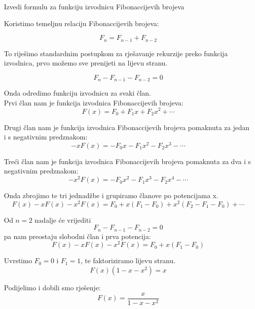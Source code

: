 \documentclass[exam.tex]{subfiles}
\begin{document}
	\begin{subtask}
		Izvedi formulu za funkciju izvodnicu Fibonaccijevih brojeva \\
	\end{subtask}
	
	Koristimo temeljnu relaciju Fibonaccijevih brojeva:
	
	\[ F_n = F_{n - 1} + F_{n - 2} \]
	
	To riješimo standardnim postupkom za rješavanje rekurzije preko funkcija izvodnica, prvo možemo sve prenijeti na lijevu stranu.
	
	\[ F_n - F_{n - 1} - F_{n - 2} = 0 \]
	
	Onda odredimo funkciju izvodnicu za svaki član. \\
	
	Prvi član nam je funkcija izvodnica Fibonaccijevih brojeva: 
	\[ F(x) = F_0 + F_1 x + F_2 x^2 + \cdots \]
	
	Drugi član nam je funkcija izvodnica Fibonaccijevih brojeva pomaknuta za jedan i s negativnim predznakom:
	\[ - x F(x) = - F_0 x - F_1 x^2 - F_2 x^3 - \cdots \]
	
	Treći član nam je funkcija izvodnica Fibonaccijevih brojeva pomaknuta za dva i s negativnim predznakom:
	\[ - x^2 F(x) = - F_0 x^2 - F_1 x^3 - F_2 x^4 - \cdots \]
	
	Onda zbrojimo te tri jednadžbe i grupiramo članove po potencijama x.
	\[ F(x) - x F(x) - x^2 F(x) = F_0 + x (F_1 - F_0) + x^2 (F_2 - F_1 - F_0) + \cdots \]
	
	Od \( n = 2 \) nadalje će vrijediti \[ F_n - F_{n - 1} - F_{n - 2} = 0 \] pa nam preostaju slobodni član i prva potencija:
	\[ F(x) - x F(x) - x^2 F(x) = F_0 + x (F_1 - F_0) \]
	
	Uvrstimo \( F_0 = 0 \) i \( F_1 = 1 \), te faktoriziramo lijevu stranu.
	\[ F(x)(1 - x - x^2) = x \]
	
	Podijelimo i dobili smo rješenje:
	\[ F(x) = \frac{x}{1 - x - x^2} \]
\end{document}
